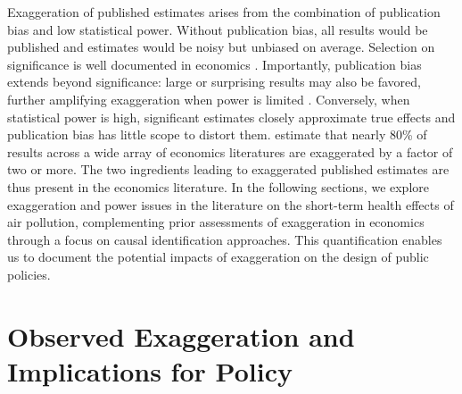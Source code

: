 \documentclass[12pt]{article}
\begin{document}
		Exaggeration of published estimates arises from the combination of publication bias and low statistical power. Without publication bias, all results would be published and estimates would be noisy but unbiased on average. Selection on significance is well documented in economics \citep{rosenthal_file_1979, brodeur_star_2016, andrews_identification_2019, vivalt_specification_2019, abadie_statistical_2020, brodeur_methods_2020}. Importantly, publication bias extends beyond significance: large or surprising results may also be favored, further amplifying exaggeration when power is limited \citep{andrews_inference_2024}. Conversely, when statistical power is high, significant estimates closely approximate true effects and publication bias has little scope to distort them. \citet{ioannidis_power_2017} estimate that nearly 80\% of results across a wide array of economics literatures are exaggerated by a factor of two or more. The two ingredients leading to exaggerated published estimates are thus present in the economics literature. In the following sections, we explore exaggeration and power issues in the literature on the short-term health effects of air pollution, complementing prior assessments of exaggeration in economics through a focus on causal identification approaches. This quantification enables us to document the potential impacts of exaggeration on the design of public policies.
			



\section{Observed Exaggeration and Implications for Policy}\label{section_lit_policy}
\end{document}

